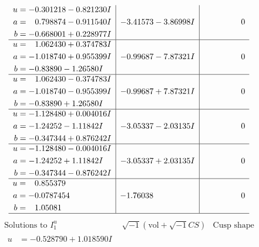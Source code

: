\documentclass[1p]{elsarticle_modified}
\theoremstyle{definition}
\newcommand{\I}{\sqrt{-1}}
\begin{document}
$$\begin{array}{c|c|c}
\begin{aligned}
u &= -0.301218 - 0.821230 I \\
a &= \phantom{-}0.798874 - 0.911540 I \\
b &= -0.668001 + 0.228977 I\end{aligned}
 & -3.41573 - 3.86998 I & \phantom{-0.000000 } 0 \\ \hline\begin{aligned}
u &= \phantom{-}1.062430 + 0.374783 I \\
a &= -1.018740 + 0.955399 I \\
b &= -0.83890 - 1.26580 I\end{aligned}
 & -0.99687 - 7.87321 I & \phantom{-0.000000 } 0 \\ \hline\begin{aligned}
u &= \phantom{-}1.062430 - 0.374783 I \\
a &= -1.018740 - 0.955399 I \\
b &= -0.83890 + 1.26580 I\end{aligned}
 & -0.99687 + 7.87321 I & \phantom{-0.000000 } 0 \\ \hline\begin{aligned}
u &= -1.128480 + 0.004016 I \\
a &= -1.24252 - 1.11842 I \\
b &= -0.347344 + 0.876242 I\end{aligned}
 & -3.05337 - 2.03135 I & \phantom{-0.000000 } 0 \\ \hline\begin{aligned}
u &= -1.128480 - 0.004016 I \\
a &= -1.24252 + 1.11842 I \\
b &= -0.347344 - 0.876242 I\end{aligned}
 & -3.05337 + 2.03135 I & \phantom{-0.000000 } 0 \\ \hline\begin{aligned}
u &= \phantom{-}0.855379\phantom{ +0.000000I} \\
a &= -0.0787454\phantom{ +0.000000I} \\
b &= \phantom{-}1.05081\phantom{ +0.000000I}\end{aligned}
 & -1.76038\phantom{ +0.000000I} & \phantom{-0.000000 } 0\\
 \hline 
 \end{array}$$\newpage$$\begin{array}{c|c|c}  
\text{Solutions to }I^u_{1}& \I (\text{vol} + \sqrt{-1}CS) & \text{Cusp shape}\\
 \hline 
\begin{aligned}
u &= -0.528790 + 1.018590 I \\

\end{aligned}
\end{array}$$
\end{document}
